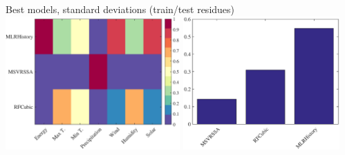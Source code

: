 \documentclass{beamer}
\begin{document}
\begin{frame}{Best models, standard deviations (train/test residues)}
\includegraphics[width=0.5\textwidth]{fig/feature_selection/EnergyWeather/best_models_testResStd_colormatrix.eps}
\includegraphics[width=0.45\textwidth]{fig/feature_selection/EnergyWeather/best_models_testResStd_bar.eps}\\


\end{frame}
%
%
\end{document}
